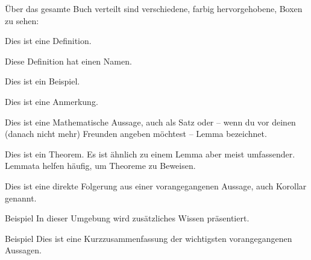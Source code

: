 \documentclass[../main.tex]{subfiles}
\begin{document}
\lipsum[2]

Über das gesamte Buch verteilt sind verschiedene, farbig hervorgehobene, Boxen zu sehen:
\begin{definition}
    Dies ist eine Definition.
\end{definition}
\begin{definition}[Titel]
    Diese Definition hat einen Namen.
\end{definition}

\begin{example}
    Dies ist ein Beispiel.    
\end{example}

\begin{remark}{}
    Dies ist eine Anmerkung.
\end{remark}

\begin{lemma}
    Dies ist eine Mathematische Aussage, auch als Satz oder -- wenn du vor deinen (danach nicht mehr) Freunden angeben möchtest -- Lemma bezeichnet.
\end{lemma}

\begin{theorem}
    Dies ist ein Theorem. Es ist ähnlich zu einem Lemma aber meist umfassender. Lemmata helfen häufig, um Theoreme zu Beweisen.
\end{theorem}

\begin{corollary}
    Dies ist eine direkte Folgerung aus einer vorangegangenen Aussage, auch Korollar genannt.
\end{corollary}

\begin{advanced}{Beispiel}
    In dieser Umgebung wird zusätzliches Wissen präsentiert.
\end{advanced}
\begin{nutshell}{Beispiel}
    Dies ist eine Kurzzusammenfassung der wichtigsten vorangegangenen Aussagen.
\end{nutshell}

\end{document}
